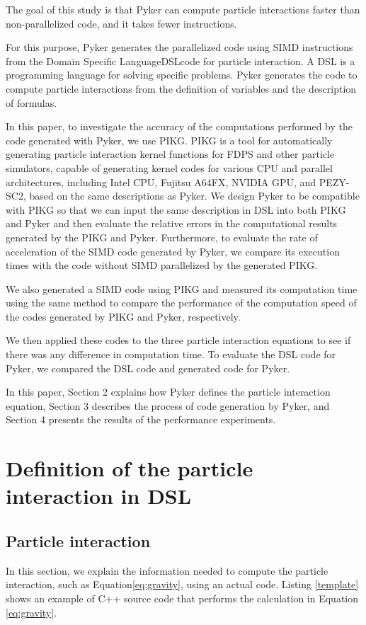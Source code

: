 \documentclass[ams]{article}
\begin{document}
The goal of this study is that Pyker can compute particle interactions faster than non-parallelized code, and it takes fewer instructions.

For this purpose, Pyker generates the parallelized code using SIMD instructions from the Domain Specific Language\lparen DSL\rparen code for particle interaction.
A DSL is a programming language for solving specific problems.
Pyker generates the code to compute particle interactions from the definition of variables and 
the description of formulas.


In this paper, to investigate the accuracy of the computations performed by the code generated with Pyker, we use PIKG\cite{PIKG}. PIKG is a tool for automatically generating particle interaction kernel functions for FDPS\cite{FDPS} and other particle simulators, capable of generating kernel codes for various CPU and parallel architectures, including Intel CPU, Fujitsu A64FX, NVIDIA GPU, and PEZY-SC2, based on the same descriptions as Pyker.
We design Pyker to be compatible with PIKG so that we can input the same description in DSL into both PIKG and Pyker and then evaluate the relative errors in the computational results generated by the PIKG and Pyker. Furthermore, to evaluate the rate of acceleration of the SIMD code generated by Pyker, we compare its execution times with the code without SIMD parallelized by the generated PIKG.


We also generated a SIMD code using PIKG and measured its computation time using the same method to compare the performance of the computation speed of the codes generated by PIKG and Pyker, respectively.

We then applied these codes to the three particle interaction equations to see if there was any difference in computation time.
To evaluate the DSL code for Pyker, we compared the DSL code and generated code for Pyker.


In this paper, Section 2 explains how Pyker defines the particle interaction equation, Section 3 describes the process of code generation by Pyker, and Section 4 presents the results of the performance experiments.

\section{Definition of the particle interaction in DSL}

\subsection{Particle interaction}
In this section, we explain the information needed to compute the particle interaction, such as Equation\eqref{eq:gravity}, using an actual code.
Listing \ref{template} shows an example of C++ source code that performs the calculation 
in Equation \eqref{eq:gravity}.
\end{document}
